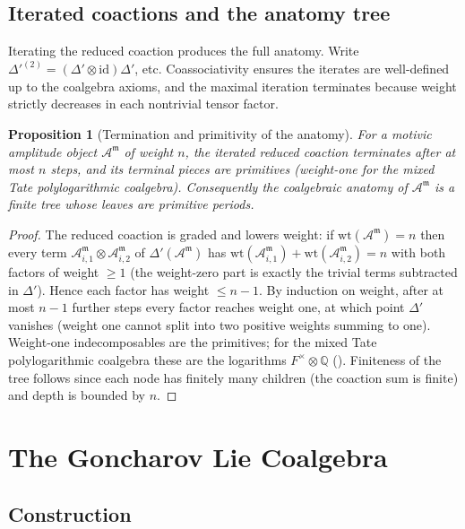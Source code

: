 \documentclass[12pt]{article}
\newtheorem{proposition}[theorem]{Proposition}
\theoremstyle{definition}
\theoremstyle{remark}
\newcommand{\Amm}{\mathcal{A}^{\mathfrak{m}}}
\newcommand{\wt}{\mathrm{wt}}
\newcommand{\coA}{\Delta}
\newcommand{\Qbb}{\mathbb{Q}}
\newcommand{\id}{\mathrm{id}}
\begin{document}
\subsection{Iterated coactions and the anatomy tree}

Iterating the reduced coaction produces the full anatomy. Write
$\coA'^{(2)}=(\coA'\otimes\id)\coA'$, etc. Coassociativity ensures the iterates are
well-defined up to the coalgebra axioms, and the maximal iteration terminates because weight
strictly decreases in each nontrivial tensor factor.

\begin{proposition}[Termination and primitivity of the anatomy]
\label{prop:termination}
For a motivic amplitude object $\Amm$ of weight $n$, the iterated reduced coaction terminates
after at most $n$ steps, and its terminal pieces are primitives (weight-one for the mixed
Tate polylogarithmic coalgebra). Consequently the coalgebraic anatomy of $\Amm$ is a finite
tree whose leaves are primitive periods.
\end{proposition}

\begin{proof}
The reduced coaction is graded and lowers weight: if $\wt(\Amm)=n$ then every term
$\Amm_{i,1}\otimes\Amm_{i,2}$ of $\coA'(\Amm)$ has $\wt(\Amm_{i,1})+\wt(\Amm_{i,2})=n$ with
both factors of weight $\ge 1$ (the weight-zero part is exactly the trivial terms subtracted
in $\coA'$). Hence each factor has weight $\le n-1$. By induction on weight, after at most
$n-1$ further steps every factor reaches weight one, at which point $\coA'$ vanishes (weight
one cannot split into two positive weights summing to one). Weight-one indecomposables are
the primitives; for the mixed Tate polylogarithmic coalgebra these are the logarithms
$F^\times\otimes\Qbb$ (). Finiteness of the tree follows since each
node has finitely many children (the coaction sum is finite) and depth is bounded by $n$.
\end{proof}

\section{The Goncharov Lie Coalgebra}
\label{sec:goncharov}

\subsection{Construction}
\end{document}
